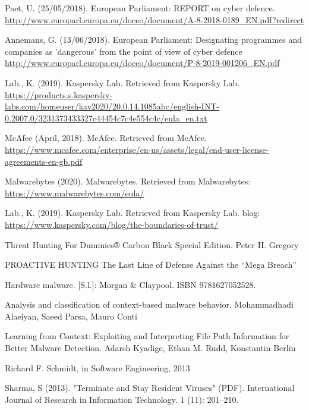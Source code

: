 \begin{thebibliography}{0}

    Paet, U. (25/05/2018). European Parliament: REPORT on cyber defence.
    \url{http://www.europarl.europa.eu/doceo/document/A-8-2018-0189_EN.pdf?redirect}

    Annemans, G. (13/06/2018). European Parliament: Designating programmes and companies as 'dangerous' from the point of view of cyber
defence
    \url{http://www.europarl.europa.eu/doceo/document/P-8-2019-001206_EN.pdf}

    Lab., K. (2019). Kaspersky Lab. Retrieved from Kaspersky Lab.
    \url{https://products.s.kaspersky-labs.com/homeuser/kav2020/20.0.14.1085abc/english-INT-0.2007.0/3231373433327c44454c7c4e554c4c/eula_en.txt}

    McAfee (April, 2018). McAfee. Retrieved from McAfee.
    \url{https://www.mcafee.com/enterprise/en-us/assets/legal/end-user-license-agreements-en-gb.pdf}

    Malwarebytes (2020). Malwarebytes. Retrieved from Malwarebytes:
    \url{https://www.malwarebytes.com/eula/}

    Lab., K. (2019). Kaspersky Lab. Retrieved from Kaspersky Lab. blog:
    \url{https://www.kaspersky.com/blog/the-boundaries-of-trust/}

    Threat Hunting For Dummies® Carbon Black Special Edition. Peter H. Gregory

    PROACTIVE HUNTING The Last Line of Defense Against the “Mega Breach”

    Hardware malware. [S.l.]: Morgan & Claypool. ISBN 9781627052528.

    Analysis and classification of context-based malware behavior. Mohammadhadi Alaeiyan, Saeed Parsa, Mauro Conti

    Learning from Context: Exploiting and Interpreting File Path Information for Better Malware Detection. Adarsh Kyadige, Ethan M. Rudd, Konstantin Berlin

    Richard F. Schmidt, in Software Engineering, 2013

    Sharma, S (2013). "Terminate and Stay Resident Viruses" (PDF). International Journal of Research in Information Technology. 1 (11): 201–210.


\end{thebibliography}
